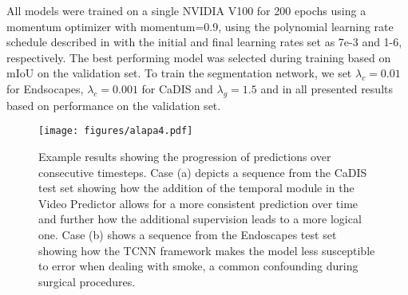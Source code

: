 \documentclass[twoside, print]{ieeecolor_arxiv}
\begin{document}
All models were trained on a single NVIDIA V100 for 200 epochs using a momentum optimizer with momentum=0.9, using the polynomial learning rate schedule described in \cite{hq1} with the initial and final learning rates set as 7e-3 and 1-6, respectively. The best performing model was selected during training based on mIoU on the validation set. To train the segmentation network, we set $\lambda_{c}=0.01$ for Endsocapes, $\lambda_{c}=0.001$ for CaDIS and $\lambda_{g}=1.5$  and in all presented results based on performance on the validation set.


\begin{figure*}[]
\centerline{\texttt{[image: figures/alapa4.pdf]}}
\caption{Example results showing the progression of predictions over consecutive timesteps. Case (a) depicts a sequence from the CaDIS test set showing how the addition of the temporal module in the Video Predictor allows for a more consistent prediction over time and further how the additional supervision leads to a more logical one. Case (b) shows a sequence from the Endoscapes test set showing how the TCNN framework makes the model less susceptible to error when dealing with smoke, a common confounding during surgical procedures. }
\label{fig4}
\end{figure*}
\end{document}
